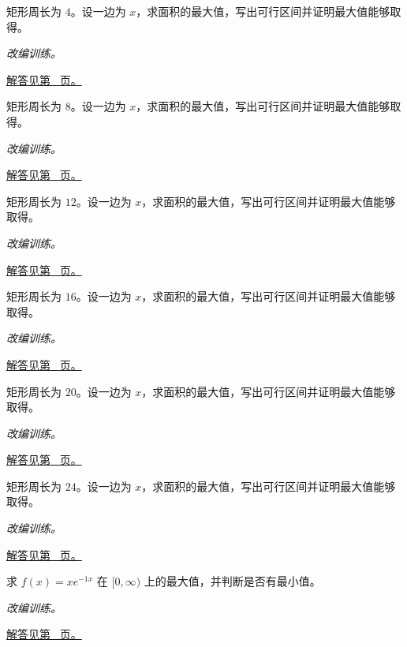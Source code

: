 \documentclass[12pt,fontset=fandol]{ctexart}
\begin{document}
\begin{example}[固定周长矩形的最大面积]\label{ex:c11q8}
矩形周长为 $4$。设一边为 $x$，求面积的最大值，写出可行区间并证明最大值能够取得。
\par\textit{改编训练。}\par\hyperref[ans:c11q8]{解答见第~\pageref{ans:c11q8} 页。}
\end{example}
\begin{example}[固定周长矩形的最大面积]\label{ex:c11q9}
矩形周长为 $8$。设一边为 $x$，求面积的最大值，写出可行区间并证明最大值能够取得。
\par\textit{改编训练。}\par\hyperref[ans:c11q9]{解答见第~\pageref{ans:c11q9} 页。}
\end{example}
\begin{example}[固定周长矩形的最大面积]\label{ex:c11q10}
矩形周长为 $12$。设一边为 $x$，求面积的最大值，写出可行区间并证明最大值能够取得。
\par\textit{改编训练。}\par\hyperref[ans:c11q10]{解答见第~\pageref{ans:c11q10} 页。}
\end{example}
\begin{example}[固定周长矩形的最大面积]\label{ex:c11q11}
矩形周长为 $16$。设一边为 $x$，求面积的最大值，写出可行区间并证明最大值能够取得。
\par\textit{改编训练。}\par\hyperref[ans:c11q11]{解答见第~\pageref{ans:c11q11} 页。}
\end{example}
\begin{example}[固定周长矩形的最大面积]\label{ex:c11q12}
矩形周长为 $20$。设一边为 $x$，求面积的最大值，写出可行区间并证明最大值能够取得。
\par\textit{改编训练。}\par\hyperref[ans:c11q12]{解答见第~\pageref{ans:c11q12} 页。}
\end{example}
\begin{example}[固定周长矩形的最大面积]\label{ex:c11q13}
矩形周长为 $24$。设一边为 $x$，求面积的最大值，写出可行区间并证明最大值能够取得。
\par\textit{改编训练。}\par\hyperref[ans:c11q13]{解答见第~\pageref{ans:c11q13} 页。}
\end{example}
\begin{example}[指数衰减与内点最大值]\label{ex:c11q14}
求 $f(x)=xe^{-1x}$ 在 $[0,\infty)$ 上的最大值，并判断是否有最小值。
\par\textit{改编训练。}\par\hyperref[ans:c11q14]{解答见第~\pageref{ans:c11q14} 页。}
\end{example}
\end{document}
